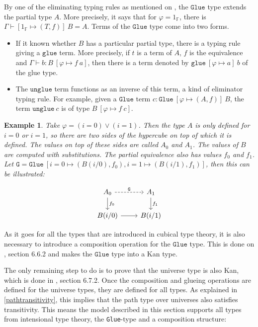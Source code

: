 \documentclass[12pt,a4paper,twoside,xetex]{book}
\newtheorem{example}[theorem]{Example}
\newcommand{\op}[1]{\mathtt{#1}}
\begin{document}
By one of the eliminating typing rules as mentioned on \cite{Huber2016}, the 
$\op{Glue}$ type extends the partial type $A$. More precisely, it says that for 
$\varphi = 1_{\mathbb{F}}$, there is $\Gamma \vdash \left[ 1_{\mathbb{F}} 
\mapsto (T,f) \right] \ B = A$. Terms of the $\op{Glue}$ type come into two 
forms.

\begin{itemize}
\item If it known whether $B$ has a particular partial type, there is a typing 
rule giving a $\op{glue}$ term. More precisely, if $t$ is a term of $A$, $f$ 
is the equivalence and $\Gamma \vdash b : B \  \left[ \varphi \mapsto f \ a 
\right]$, then there is a term denoted by $\op{glue} \ [\varphi \mapsto a ] \ 
b$ of the glue type. 
\item The $\op{unglue}$ term functions as an inverse of this term, a kind of 
eliminator typing rule. For example, given a $\op{Glue}$ term $c : \op{Glue} \ 
[\varphi \mapsto (A,f)] \ B$, the term $\op{unglue} \ c$ is of type $B \ 
[\varphi \mapsto f\ c]$.
\end{itemize}

\begin{example}

Take $\varphi = (i=0) \vee (i=1)$. Then the type $A$ is only defined for $i = 
0$ or $i =1$, so there are two sides of the hypercube on top of which it is 
defined. The values on top of these sides are called $A_0$ and $A_1$. The 
values of $B$ are computed with substitutions. The partial equivalence also has 
values $f_0$ and $f_1$. Let $\op{G} = \op{Glue} \  [i = 0 \mapsto 
(B(i/0),f_0), i=1 \mapsto (B(i/1), f_1)]$, then this can be illustrated:

\[ \begin{tikzcd}
A_0 \arrow[r, dashed, "\op{G}" ] \arrow[d, "f_0"]	
& A_1  \arrow[d, "f_1"]  \\
B(i/0) 	
	\arrow[r, ""]
& B(i/1)  
\end{tikzcd}
\]


\end{example}

As it goes for all the types that are introduced in cubical type theory, it is 
also necessary to introduce a composition operation for the $\op{Glue}$ type. 
This is done on \cite{Huber2016}, section 6.6.2 and makes the $\op{Glue}$ type 
into a Kan type.

The only remaining step to do is to prove that the universe type is also Kan, 
which is done in \cite{Huber2016}, section 6.7.2. Once the composition and 
glueing operations are defined for the universe types, they are defined for all 
types. As explained in \cref{pathtransitivity}, this implies that the path type 
over universes also satisfies transitivity. This means the model described in 
this section supports all types from intensional type theory, the 
\texttt{Glue}-type and a composition structure:
\end{document}
